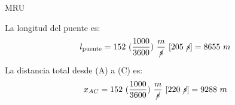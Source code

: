 \documentclass{beamer}
\begin{document}
\begin{frame}{MRU}
% 

La longitud del puente es:
{\large
\begin{equation} 
l_{\text{puente}}=
152~(\frac{1000}{3600})~
\frac{m}{\cancel{s}}~[205~\cancel{s}]=
8655~m
\end{equation}
}

                               

La distancia total desde (A) a (C) es: 
{\large
\begin{equation} 
x_{AC}=
152~(\frac{1000}{3600})~
\frac{m}{\cancel{s}}~[220~\cancel{s}]=
9288~m
\end{equation}
}

\end{frame}


\end{document}
